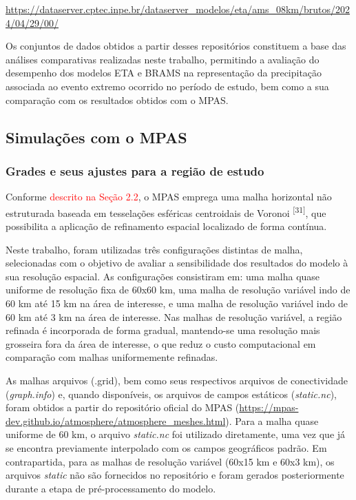 \documentclass[12pt,a4paper,oneside]{book}
\begin{document}
\url{https://dataserver.cptec.inpe.br/dataserver_modelos/eta/ams_08km/brutos/2024/04/29/00/}

Os conjuntos de dados obtidos a partir desses repositórios constituem a base das análises comparativas realizadas neste trabalho, permitindo a avaliação do desempenho dos modelos ETA e BRAMS na representação da precipitação associada ao evento extremo ocorrido no período de estudo, bem como a sua comparação com os resultados obtidos com o MPAS.

\subsection{Simulações com o MPAS}

\subsubsection{Grades e seus ajustes para a região de estudo}

Conforme \textcolor{red}{descrito na Seção 2.2}, o MPAS emprega uma malha horizontal não estruturada baseada em tesselações esféricas centroidais de Voronoi \textsuperscript{{[}31{]}}, que possibilita a aplicação de refinamento espacial localizado de forma contínua.

Neste trabalho, foram utilizadas três configurações distintas de malha, selecionadas com o objetivo de avaliar a sensibilidade dos resultados do modelo à sua resolução espacial. As configurações consistiram em: uma malha quase uniforme de resolução fixa de 60x60 km, uma malha de resolução variável indo de 60 km até 15 km na área de interesse, e uma malha de resolução variável indo de 60 km até 3 km na área de interesse. Nas malhas de resolução variável, a região refinada é incorporada de forma gradual, mantendo-se uma resolução mais grosseira fora da área de interesse, o que reduz o custo computacional em comparação com malhas uniformemente refinadas.

As malhas arquivos (.grid), bem como seus respectivos arquivos de conectividade (\emph{graph.info}) e, quando disponíveis, os arquivos de campos estáticos (\emph{static.nc}), foram obtidos a partir do repositório oficial do MPAS (\url{https://mpas-dev.github.io/atmosphere/atmosphere_meshes.html}). Para a malha quase uniforme de 60 km, o arquivo \emph{static.nc} foi utilizado diretamente, uma vez que já se encontra previamente interpolado com os campos geográficos padrão. Em contrapartida, para as malhas de resolução variável (60x15 km e 60x3 km), os arquivos \emph{static} não são fornecidos no repositório e foram gerados posteriormente durante a etapa de pré-processamento do modelo.
\end{document}
